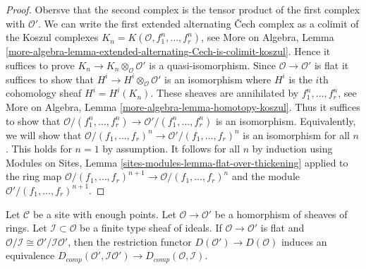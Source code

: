 \begin{proof}
Obersve that the second complex is the tensor product of the first
complex with $\mathcal{O}'$. We can write the first extended
alternating {\v C}ech complex as a colimit of the Koszul complexes
$K_n = K(\mathcal{O}, f_1^n, \ldots, f_r^n)$, see
More on Algebra, Lemma
\ref{more-algebra-lemma-extended-alternating-Cech-is-colimit-koszul}.
Hence it suffices to prove $K_n \to K_n \otimes_\mathcal{O} \mathcal{O}'$
is a quasi-isomorphism. Since $\mathcal{O} \to \mathcal{O}'$ is flat
it suffices to show that $H^i \to H^i \otimes_\mathcal{O} \mathcal{O}'$
is an isomorphism where $H^i$ is the $i$th cohomology sheaf
$H^i = H^i(K_n)$. These sheaves are annihilated by $f_1^n, \ldots, f_r^n$, see
More on Algebra, Lemma \ref{more-algebra-lemma-homotopy-koszul}.
Thus it suffices to show that
$\mathcal{O}/(f_1^n, \ldots, f_r^n) \to \mathcal{O}'/(f_1^n, \ldots, f_r^n)$
is an isomorphism. Equivalently, we will show that
$\mathcal{O}/(f_1, \ldots, f_r)^n \to \mathcal{O}'/(f_1, \ldots, f_r)^n$
is an isomorphism for all $n$. This holds for $n = 1$ by assumption.
It follows for all $n$ by induction using
Modules on Sites, Lemma \ref{sites-modules-lemma-flat-over-thickening}
applied to the ring map
$\mathcal{O}/(f_1, \ldots, f_r)^{n + 1} \to \mathcal{O}/(f_1, \ldots, f_r)^n$
and the module $\mathcal{O}'/(f_1, \ldots, f_r)^{n + 1}$.
\end{proof}

\begin{lemma}
\label{lemma-restriction-derived-complete-equivalence}
Let $\mathcal{C}$ be a site with enough points.
Let $\mathcal{O} \to \mathcal{O}'$ be a
homorphism of sheaves of rings. Let $\mathcal{I} \subset \mathcal{O}$
be a finite type sheaf of ideals.
If $\mathcal{O} \to \mathcal{O}'$ is flat and
$\mathcal{O}/\mathcal{I} \cong \mathcal{O}'/\mathcal{I}\mathcal{O}'$,
then the restriction functor $D(\mathcal{O}') \to D(\mathcal{O})$
induces an equivalence
$D_{comp}(\mathcal{O}', \mathcal{I}\mathcal{O}') \to
D_{comp}(\mathcal{O}, \mathcal{I})$.
\end{lemma}

